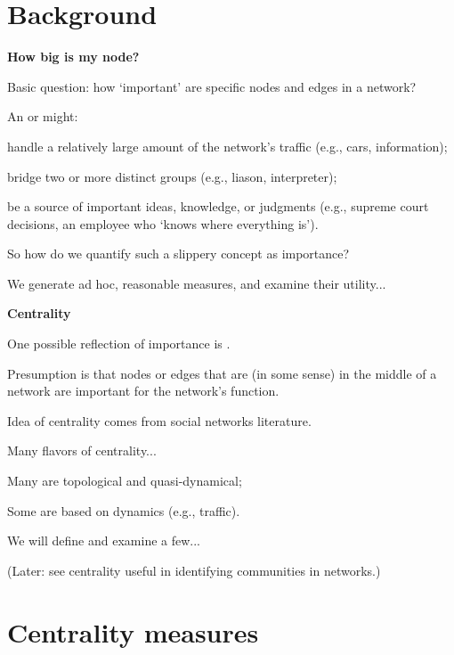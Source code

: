 \section{Background}



  \textbf{How big is my node?}

  
   
    \alert{Basic question:} 
    how `important' are specific nodes and edges in a network?
   
    An  or  might:
    
     
      \alert{handle} a relatively large amount of the network's traffic
      (e.g., cars, information);
     
      \alert{bridge} two or more distinct groups (e.g., liason, interpreter);
    
      be a \alert{source} of important ideas, knowledge, or judgments
      (e.g., supreme court decisions, an employee who `knows where everything is').
    
   
    So how do we quantify such a slippery concept as importance?
   
    We generate ad hoc, reasonable
    measures, and examine their utility...
  


  \textbf{Centrality}

  
  
    One possible reflection of importance is
    .
  
    Presumption is that nodes or edges 
    that are (in some sense) in the middle of
    a network are important for the network's function.
  
    Idea of centrality comes
    from social networks literature\cite{wasserman1994a}.
  
    Many flavors of centrality...
    
     
      Many are topological and quasi-dynamical;
     
      Some are based on dynamics (e.g., traffic).
    
  
    We will define and examine a few...
  
    (Later: see centrality useful in identifying communities
    in networks.)
  


\section{Centrality measures}

